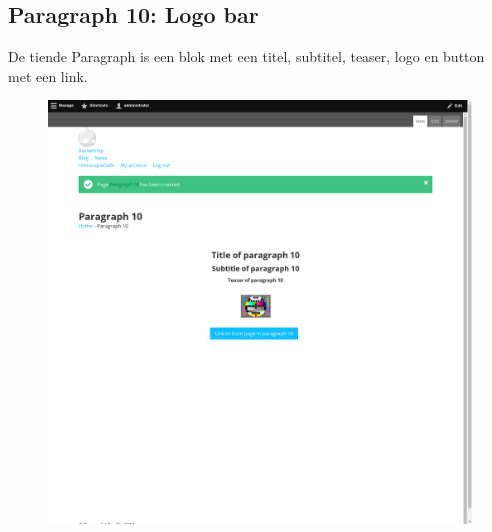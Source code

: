 \subsection{Paragraph 10: Logo bar}
De tiende Paragraph is een blok met een titel, subtitel, teaser, logo en button met een link.
\begin{figure}[h]
\includegraphics[width=1\textwidth]{img/p010.png}
\end{figure}

\clearpage
